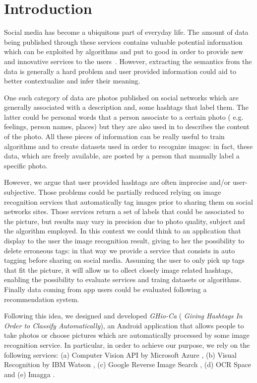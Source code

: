 \section{Introduction}
\label{sec:introduction}

Social media has become a ubiquitous part of everyday life. The amount of data 
being published through these services contains valuable potential information 
which can be exploited by algorithms and put to good in order to provide new 
and innovative services to the users~\cite{ref1}. However, extracting the 
semantics from the data is generally a hard problem and user provided 
information could aid to better contextualize and infer their meaning.

One such category of data are photos published on social networks which are 
generally associated with a description and, some hashtags that label them. 
The latter could be personal words that a person associate to a certain photo (
e.g. feelings, person names, places) but they are also used in to describes  
the content of the photo. All these pieces of information can be really useful 
to train algorithms and to create datasets used in order to recognize images: 
in fact, these data, which are freely available, are posted by a person that 
manually label a specific photo.

However, we argue that user provided hashtags are often imprecise and/or 
user-subjective. Those problems could be partially reduced relying on image 
recognition services that automatically tag images prior to sharing them on 
social networks sites. Those services return a set of labels that could be 
associated to the  picture, but results may vary in precision due to photo 
quality, subject and the algorithm employed. In this context we could think to 
an application that display to the user the image recognition result, giving 
to her the possibility to delete erroneous tags: in that way we provide a 
service that consists in auto tagging before sharing on social media. Assuming 
the user to only pick up tags that fit the picture, it will allow us to ollect 
closely image related hashtags, enabling the possibility to evaluate services 
and traing datasets or algorithms. Finally data coming from app users could be 
evaluated following a recommendation system.

Following this idea, we designed and developed \textit{GHio-Ca} (\textit{
Giving  Hashtags In Order to Classify Automatically}), an Android application 
that allows people to take photos or choose pictures which are automatically 
processed by some image recognition service. In particular, in order to 
achieve our purpose, we rely on the following services: (a) Computer Vision 
API by Microsoft Azure \cite{Microsoft}, (b) Visual Recognition by IBM Watson 
\cite{IBM}, (c) Google Reverse Image Search \cite{Google}, (d) OCR Space \cite{
OCR} and (e) Imagga \cite{Imagga}.

